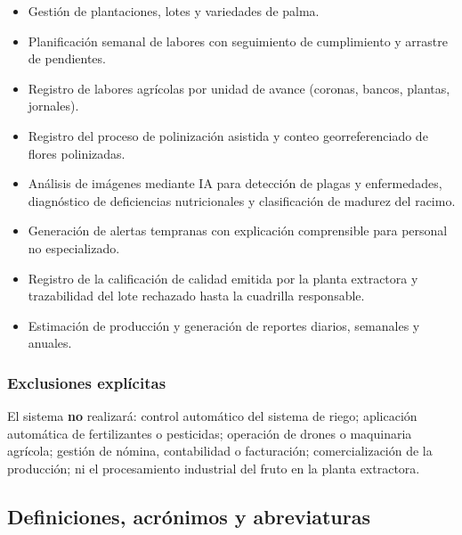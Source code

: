 \documentclass[11pt,a4paper]{article}
\begin{document}
\begin{itemize}[nosep]
  \item Gestión de plantaciones, lotes y variedades de palma.
  \item Planificación semanal de labores con seguimiento de cumplimiento y arrastre de pendientes.
  \item Registro de labores agrícolas por unidad de avance (coronas, bancos, plantas, jornales).
  \item Registro del proceso de polinización asistida y conteo georreferenciado de flores polinizadas.
  \item Análisis de imágenes mediante IA para detección de plagas y enfermedades, diagnóstico de
        deficiencias nutricionales y clasificación de madurez del racimo.
  \item Generación de alertas tempranas con explicación comprensible para personal no especializado.
  \item Registro de la calificación de calidad emitida por la planta extractora y trazabilidad
        del lote rechazado hasta la cuadrilla responsable.
  \item Estimación de producción y generación de reportes diarios, semanales y anuales.
\end{itemize}

\subsubsection{Exclusiones explícitas}

El sistema \textbf{no} realizará: control automático del sistema de riego; aplicación automática de
fertilizantes o pesticidas; operación de drones o maquinaria agrícola; gestión de nómina, contabilidad
o facturación; comercialización de la producción; ni el procesamiento industrial del fruto en la
planta extractora.

\subsection{Definiciones, acrónimos y abreviaturas}
\end{document}

